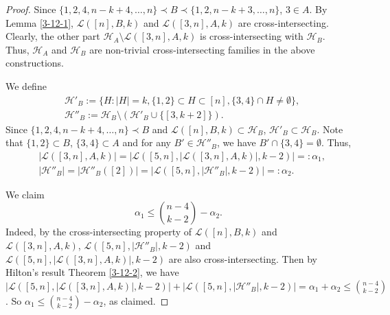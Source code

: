 \documentclass[a4paper,11pt]{article}
\newcommand{\m}{\mathcal}
\begin{document}
\begin{proof}
Since $\{1,2,4,n-k+4, \dots, n\}\prec B \prec \{1,2, n-k+3, \dots,n\}$, $3\in A$. 
By Lemma \ref{3-12-1}, $\m L([n], B, k)$ and $\m L([3,n], A, k)$ are cross-intersecting. Clearly, the other part $\m H_A\setminus \m L([3,n], A, k)$ is cross-intersecting with $\m H_B$. 
Thus, $\m H_A$ and $\m H_B$ are non-trivial cross-intersecting families in the above constructions.

 We define
\begin{align*}
&\m H'_B:=\{H: |H|=k, \{1,2\}\subset H\subset [n], \{3,4\}\cap H\ne \emptyset\},\\
&\m H''_B:=\m H_B\setminus (\m H'_B \cup \{[3,k+2]\}).
\end{align*}
Since  $\{1,2,4,n-k+4, \dots, n\}\prec B$ and $\m L([n], B, k)\subset \m H_B$,
$\m H'_B\subset \m H_B$.
Note that $\{1,2\}\subset B$, $\{3,4\}\subset A$ and for any $B'\in \m H''_B$, we have  $B'\cap \{3,4\}=\emptyset$. 
Thus, 
\begin{align*}
&|\m L([3,n], A, k)|=|\m L([5,n], |\m L([3,n], A, k)|, k-2)|=:\alpha_1,\\
&|\m H''_B|=|\m H''_B([2])|=|\m L([5,n], |\m H''_B|, k-2)|=:\alpha_2.
\end{align*}

We claim 
\begin{equation}\label{3-12-3}
\alpha_1 \le {n-4\choose k-2}-\alpha_2.
\end{equation}
Indeed, by the cross-intersecting property of $\m L([n], B, k)$ and $\m L([3,n], A, k)$,  $\m L([5,n], |\m H''_B|, k-2)$ and 
$\m L([5,n], |\m L([3,n], A, k)|, k-2)$ are also cross-intersecting. Then by Hilton's result Theorem \ref{3-12-2}, we have $|\m L([5,n], |\m L([3,n], A, k)|, k-2)|+|\m L([5,n], |\m H''_B|, k-2)|=\alpha_1+\alpha_2 \le {n-4\choose k-2}$. So $\alpha_1 \le {n-4\choose k-2}-\alpha_2$, as claimed. 


\end{proof}
\end{document}
